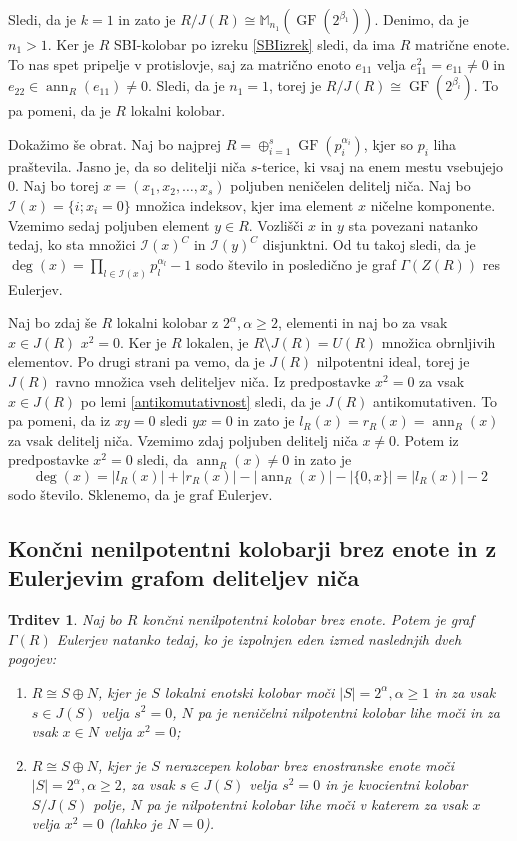 \documentclass[a4paper, 12pt]{amsart}
\theoremstyle{definition} %
\theoremstyle{plain} %
\newtheorem{trditev}[definicija]{Trditev}
\newcommand{\M}{\mathbb M}
\DeclareMathOperator{\ann}{ann}
\DeclareMathOperator{\GF}{GF}
\begin{document}
Sledi, da je $k=1$ in zato je $R/J(R) \cong \M_{n_1}(\GF(2^{\beta_1}))$. Denimo, da je $n_1 > 1$. Ker je $R$ SBI-kolobar po izreku \ref{SBIizrek} sledi, da ima $R$ matrične enote. To nas spet pripelje v protislovje, saj za matrično enoto $e_{11}$ velja $e_{11}^2 = e_{11} \neq 0$ in $e_{22}\in \ann_R(e_{11}) \neq 0$. Sledi, da je $n_1 = 1$, torej je $R/J(R) \cong \GF(2^{\beta_i})$. To pa pomeni, da je $R$  lokalni kolobar.

Dokažimo še obrat. Naj bo najprej $R= \oplus_{i=1}^s \GF(p_i^{\alpha_i})$, kjer so $p_i$ liha praštevila. Jasno je, da so delitelji niča $s$-terice, ki vsaj na enem mestu vsebujejo 0. Naj bo torej $x=(x_1,x_2,\dots,x_s)$ poljuben neničelen delitelj  niča. Naj bo $\mathcal{I}(x)=\{i;x_i=0\}$ množica indeksov, kjer ima element $x$ ničelne komponente. Vzemimo sedaj poljuben element $y\in R$. Vozlišči $x$ in $y$ sta povezani natanko tedaj, ko sta množici $\mathcal{I}(x)^C$ in $\mathcal{I}(y)^C$ disjunktni. Od tu takoj sledi, da je $\deg(x) = \prod_{l\in \mathcal{I}(x)} p_l^{\alpha_l}-1$ sodo število in posledično je graf $\Gamma(Z(R))$ res Eulerjev.

Naj bo zdaj še $R$ lokalni kolobar z $2^\alpha, \alpha \ge 2$, elementi in naj bo za vsak $x\in J(R)$ $ x^2 = 0$. Ker je $R$ lokalen,  je $R\setminus J(R)=U(R)$ množica obrnljivih elementov. Po drugi strani pa vemo, da je $J(R)$ nilpotentni ideal, torej je $J(R)$ ravno množica vseh deliteljev niča. Iz predpostavke $x^2 = 0$ za vsak $x\in J(R)$ po lemi \ref{antikomutativnost} sledi, da je $J(R)$ antikomutativen. To pa pomeni, da iz $xy = 0$ sledi $yx=0$ in zato je $l_R(x) = r_R(x) = \ann_R(x)$ za vsak delitelj niča. Vzemimo zdaj poljuben delitelj niča $x\neq 0$. Potem iz predpostavke $x^2 = 0$ sledi, da $\ann_R(x)\neq 0$ in zato je 
$$
\deg(x) = |l_R(x)| + |r_R(x)| -| \ann_R(x) | - |\{0,x\}| = |l_R(x)| -2 
$$
sodo število. Sklenemo, da je graf Eulerjev. 
\endproof

\subsection{Končni nenilpotentni kolobarji brez enote in z Eulerjevim grafom deliteljev niča}

\begin{trditev}
\label{EulerBrezEnote}
Naj bo $R$ končni nenilpotentni kolobar brez enote. Potem je graf $\Gamma(R)$ Eulerjev natanko tedaj, ko je izpolnjen eden izmed naslednjih dveh pogojev:
\begin{enumerate}
\item $R\cong S \oplus N$, kjer je $S$ lokalni enotski kolobar moči $|S| = 2^{\alpha}, \alpha \ge 1$ in za vsak $s\in J(S)$ velja $s^2 = 0$, $N$ pa je neničelni nilpotentni kolobar lihe moči in za vsak $x\in N$ velja $x^2 = 0$;
\item $R\cong S\oplus N$, kjer je $S$ nerazcepen kolobar brez enostranske enote moči $|S| = 2^{\alpha}, \alpha\ge 2$, za vsak $s\in J(S)$ velja $s^2 = 0$ in je kvocientni kolobar $S/J(S)$ polje, $N$ pa je nilpotentni kolobar lihe moči v katerem za vsak $x$ velja $x^2 =0 $ (lahko je $N=0$). 
\end{enumerate}
\end{trditev}
\end{document}
